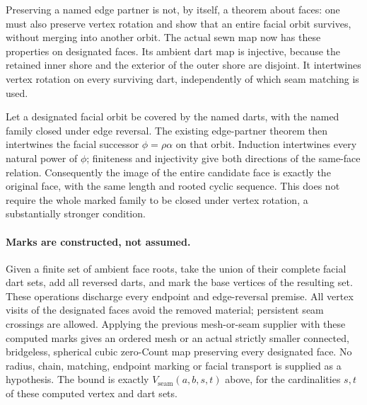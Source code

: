 Preserving a named edge partner is not, by itself, a theorem about faces:
one must also preserve vertex rotation and show that an entire facial orbit
survives, without merging into another orbit. The actual sewn map now has
these properties on designated faces. Its ambient dart map is injective,
because the retained inner shore and the exterior of the outer shore are
disjoint. It intertwines vertex rotation on every surviving dart, independently
of which seam matching is used.

Let a designated facial orbit be covered by the named darts, with the named
family closed under edge reversal. The existing edge-partner theorem then
intertwines the facial successor $\phi=\rho\alpha$ on that orbit. Induction
intertwines every natural power of $\phi$; finiteness and injectivity give
both directions of the same-face relation. Consequently the image of the
entire candidate face is exactly the original face, with the same length
and rooted cyclic sequence. This does not require the whole marked family
to be closed under vertex rotation, a substantially stronger condition.

\paragraph{Marks are constructed, not assumed.}
Given a finite set of ambient face roots, take the union of their complete
facial dart sets, add all reversed darts, and mark the base vertices of
the resulting set. These operations discharge every endpoint and
edge-reversal premise. All vertex visits of the designated faces avoid
the removed material; persistent seam crossings are allowed.
Applying the previous mesh-or-seam supplier with these computed marks gives
an ordered mesh or an actual strictly smaller connected, bridgeless,
spherical cubic zero-Count map preserving every designated face. No radius,
chain, matching, endpoint marking or facial transport is supplied as a
hypothesis. The bound is exactly $V_{\mathrm{seam}}(a,b,s,t)$ above, for
the cardinalities $s,t$ of these computed vertex and dart sets.

